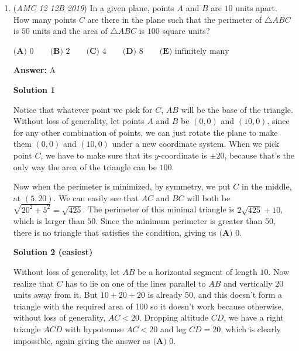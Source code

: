 \begin{enumerate}
 



\textbf{Solution 4 (Solution 3, Formally)}

Consider $12a=14b \implies 6a = 7b \implies a = \frac{7b}{6}$. Then, $12a = 20n$ or $3a= 5n$ so $a~|~5$. It follows that only $a = 35$ satisfies this, so our answer is $n = 7 \cdot 3 = \boxed{21}$.

 


	\item (\textit{AMC 12 12B 2019}) In a given plane, points $A$ and $B$ are $10$ units apart. How many points $C$ are there in the plane such that the perimeter of $\triangle ABC$ is $50$ units and the area of $\triangle ABC$ is $100$ square units?


 $\textbf{(A) }0\qquad\textbf{(B) }2\qquad\textbf{(C) }4\qquad\textbf{(D) }8\qquad\textbf{(E) }\text{infinitely many}$

 \textbf{Answer: }A



\textbf{Solution 1}

Notice that whatever point we pick for $C$, $AB$ will be the base of the triangle. Without loss of generality, let points $A$ and $B$ be $(0,0)$ and $(10,0)$, since for any other combination of points, we can just rotate the plane to make them $(0,0)$ and $(10,0)$ under a new coordinate system. When we pick point $C$, we have to make sure that its $y$-coordinate is $\pm20$, because that's the only way the area of the triangle can be $100$. 

 Now when the perimeter is minimized, by symmetry, we put $C$ in the middle, at $(5, 20)$. We can easily see that $AC$ and $BC$ will both be $\sqrt{20^2+5^2} = \sqrt{425}$. The perimeter of this minimal triangle is $2\sqrt{425} + 10$, which is larger than $50$. Since the minimum perimeter is greater than $50$, there is no triangle that satisfies the condition, giving us $\boxed{\textbf{(A) }0}$.

 



\textbf{Solution 2 (easiest)}

Without loss of generality, let $AB$ be a horizontal segment of length $10$. Now realize that $C$ has to lie on one of the lines parallel to $AB$ and vertically $20$ units away from it. But $10+20+20$ is already 50, and this doesn't form a triangle with the required area of 100 so it doesn't work because otherwise, without loss of generality, $AC<20$. Dropping altitude $CD$, we have a right triangle $ACD$ with hypotenuse $AC<20$ and leg $CD=20$, which is clearly impossible, again giving the answer as $\boxed{\textbf{(A) }0}$.


\end{enumerate}
